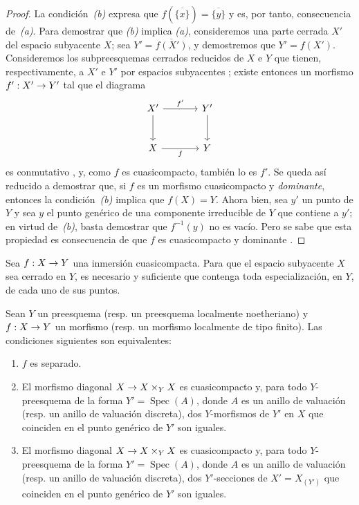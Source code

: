 \documentclass[oneside,10pt]{amsart}
\makeatletter
\newcommand{\ega@arrow}[2]{\mathchoice{#1}{#2}{#2}{#2}}
\renewcommand{\to}{\ega@arrow{\longrightarrow}{\rightarrow}}
\newcommand{\oldpage}[2][]{\marginnote{\normalfont\footnotesize\textbf{#1}~|~#2}\ignorespaces}
\let\EGAOriginalLabel\label
\renewcommand{\label}[1]{\phantomsection\EGAOriginalLabel{#1}}
\makeatother
\begin{document}
\begin{proof}
La condición~\emph{(b)} expresa que
$f(\overline{\{x\}})=\overline{\{y\}}$
y es, por tanto, consecuencia de~\emph{(a)}.
Para demostrar que \emph{(b)} implica \emph{(a)}, consideremos una parte cerrada $X'$ del espacio subyacente $X$;
sea $Y'=\overline{f(X')}$, y demostremos que $Y'=f(X')$.
Consideremos los subpreesquemas cerrados reducidos de $X$ e $Y$ que tienen, respectivamente, a $X'$ e $Y'$ por espacios subyacentes ;
existe entonces un morfismo $f':X'\to Y'$ tal que el diagrama
\[
\begin{tikzcd}[column sep=large,row sep=large]
X' \arrow[r,"f'"] \arrow[d] & Y' \arrow[d] \\
X \arrow[r,"f"'] & Y
\end{tikzcd}
\]
es conmutativo , y, como $f$ es cuasicompacto, también lo es $f'$.
Se queda así reducido a demostrar que, si $f$ es un morfismo cuasicompacto y \emph{dominante}, entonces
\oldpage[II]{142}
la condición~\emph{(b)} implica que $f(X)=Y$.
Ahora bien, sea $y'$ un punto de $Y$ y sea $y$ el punto genérico de una componente irreducible de $Y$ que contiene a $y'$;
en virtud de~\emph{(b)}, basta demostrar que $f^{-1}(y)$ no es vacío.
Pero se sabe que esta propiedad es consecuencia de que $f$ es cuasicompacto y dominante .
\end{proof}

\begin{corollary}[7.2.2]
\label{II.7.2.2-fr}
Sea $f:X\to Y$ una inmersión cuasicompacta.
Para que el espacio subyacente $X$ sea cerrado en $Y$, es necesario y suficiente que contenga toda especialización, en $Y$, de cada uno de sus puntos.
\end{corollary}


\begin{proposition}[7.2.3]
\label{II.7.2.3-fr}
Sean $Y$ un preesquema \textup{(resp.} un preesquema localmente noetheriano\textup{)} y $f:X\to Y$ un morfismo \textup{(resp.} un morfismo localmente de tipo finito\textup{)}.
Las condiciones siguientes son equivalentes:
\begin{enumerate}
  \item[\rm{(a)}] $f$ es separado.
  \item[\rm{(b)}] El morfismo diagonal $X\to X\times_YX$ es cuasicompacto y, para todo $Y$-preesquema de la forma $Y'=\operatorname{Spec}(A)$, donde $A$ es un anillo de valuación \textup{(resp.} un anillo de valuación discreta\textup{)}, dos $Y$-morfismos de $Y'$ en $X$ que coinciden en el punto genérico de $Y'$ son iguales.
  \item[\rm{(c)}] El morfismo diagonal $X\to X\times_YX$ es cuasicompacto y, para todo $Y$-preesquema de la forma $Y'=\operatorname{Spec}(A)$, donde $A$ es un anillo de valuación \textup{(resp.} un anillo de valuación discreta\textup{)}, dos $Y'$-secciones de $X'=X_{(Y')}$ que coinciden en el punto genérico de $Y'$ son iguales.
\end{enumerate}
\end{proposition}
\end{document}
